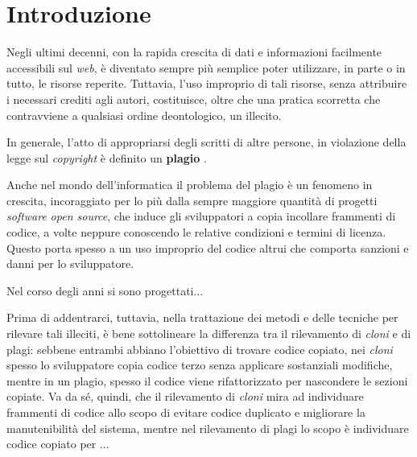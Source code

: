 \chapter{Introduzione}
Negli ultimi decenni, con la rapida crescita di dati e informazioni facilmente accessibili sul \textit{web}, è diventato sempre più semplice poter utilizzare, in parte o in tutto, le risorse reperite.
%
Tuttavia, l'uso improprio di tali risorse, senza attribuire i necessari crediti agli autori, costituisce, oltre che una pratica scorretta che contravviene a qualsiasi ordine deontologico, un illecito. 

In generale, l'atto di appropriarsi degli scritti di altre persone, in violazione della legge sul \textit{copyright} è definito un \textbf{plagio} \cite{britannica}.

Anche nel mondo dell'informatica il problema del plagio è un fenomeno in crescita, incoraggiato per lo più dalla sempre maggiore quantità di progetti \textit{software} \textit{open source}, che induce gli sviluppatori a copia incollare frammenti di codice, a volte neppure conoscendo le relative condizioni e termini di licenza.
%
Questo porta spesso a un uso improprio del codice altrui che comporta sanzioni e danni per lo sviluppatore.

Nel corso degli anni si sono progettati...

Prima di addentrarci, tuttavia, nella trattazione dei metodi e delle tecniche per rilevare tali illeciti, è bene sottolineare la differenza tra il rilevamento di \textit{cloni} e di plagi: sebbene entrambi abbiano l'obiettivo di trovare codice copiato, nei \textit{cloni} spesso lo sviluppatore copia codice terzo senza applicare sostanziali modifiche, mentre in un plagio, spesso il codice viene rifattorizzato per nascondere le sezioni copiate. 
%
Va da sé, quindi, che il rilevamento di \textit{cloni} mira ad individuare frammenti di codice allo scopo di evitare codice duplicato e migliorare la manutenibilità del sistema, mentre nel rilevamento di plagi lo scopo è individuare codice copiato per ...

